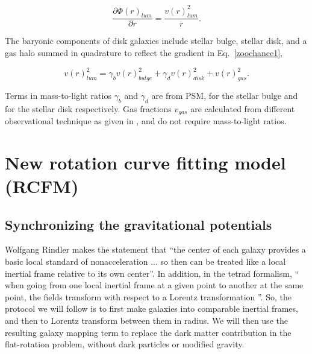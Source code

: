 \documentclass[reprint,%
 amsmath,amssymb,
 aps,
]{revtex4-1}
\begin{document}
\begin{equation}
 \frac{\partial \Phi(r)_{lum}}{\partial r}    =\frac{v(r)_{lum}^2}{r}.  
    \label{zoochance1}
\end{equation}

  

The baryonic components of disk   galaxies include stellar bulge, stellar disk, and a gas halo   summed in quadrature to reflect the gradient in Eq.~\ref{zoochance1}, 
  
   \begin{equation}
v(r)_{lum}^2 = \gamma_b v(r)_{bulge}^2 +  \gamma_d v(r)_{disk}^2 + v(r)_{gas}^2.  
\label{eq:zonte3}
\end{equation} 
  
Terms in mass-to-light ratios $\gamma_b$ and $\gamma_d$ are  from PSM,  for the stellar bulge and for the stellar disk      respectively. 
  Gas fractions $v_{gas}$ are calculated from different observational technique as given in  \cite{1983MNRAS.203..735C}, and do not require  mass-to-light ratios.  
  
% 
% 
% 
% 
\section{New rotation curve fitting model (RCFM)}
\subsection{Synchronizing the gravitational potentials \label{sec:gravDets}}

 Wolfgang Rindler makes the  statement that      ``the center of each galaxy provides a basic local standard of nonacceleration ... so then can be treated like a local inertial frame relative to its own center''\cite{rindler2013essential}.  In addition,   in the tetrad formalism,   `` when going from
one local inertial frame at a given point to another at the same point, the fields transform
with respect to a Lorentz transformation ''\cite{jetzer}. 
So,  the protocol we will follow is to first make galaxies into comparable inertial frames, and then  to      Lorentz  transform   
    between them in radius.  
    We will then use the resulting galaxy mapping term  to replace the dark matter contribution in  the flat-rotation problem,  without dark particles or modified gravity.  
\end{document}
